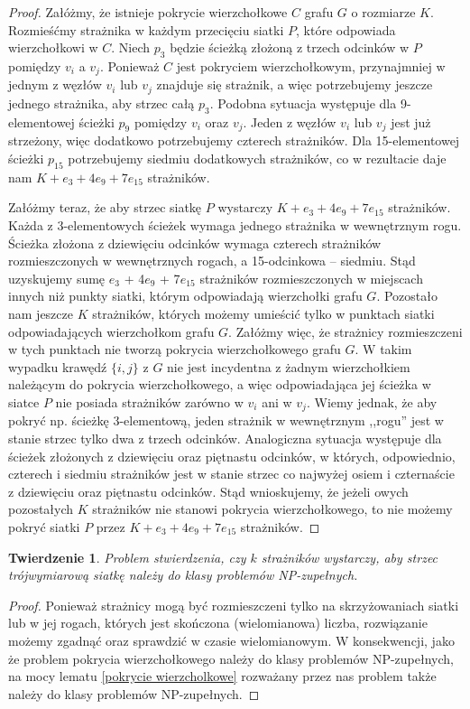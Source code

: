 \documentclass{xmgr}
\newtheorem{Twierdzenie}{Twierdzenie}
\theoremstyle{definition}
\begin{document}
\begin{proof} 
	Załóżmy, że istnieje pokrycie wierzchołkowe $C$ grafu $G$ o rozmiarze $K$. Rozmieśćmy strażnika w każdym przecięciu siatki $P$, które odpowiada wierzchołkowi w $C$.
	Niech $p_3$ będzie ścieżką złożoną z trzech odcinków w $P$ pomiędzy $v_i$ a $v_j$. Ponieważ $C$ jest pokryciem wierzchołkowym, przynajmniej w jednym z węzłów $v_i$ lub $v_j$ znajduje się strażnik, a więc potrzebujemy jeszcze jednego strażnika, aby strzec całą $p_3$. Podobna sytuacja występuje dla 9-elementowej ścieżki $p_9$ pomiędzy $v_i$ oraz $v_j$. Jeden z węzłów $v_i$ lub $v_j$ jest już strzeżony, więc dodatkowo potrzebujemy czterech strażników. Dla 15-elementowej ścieżki $p_{15}$ potrzebujemy siedmiu dodatkowych strażników, co w rezultacie daje nam $K + e_3 + 4e_9 + 7e_{15}$ strażników.

	\indent Załóżmy teraz, że aby strzec siatkę $P$ wystarczy $K + e_3 + 4e_9 + 7e_{15}$ strażników. Każda z 3-elementowych ścieżek wymaga jednego strażnika w wewnętrznym rogu. Ścieżka złożona z dziewięciu odcinków wymaga czterech strażników rozmieszczonych w wewnętrznych rogach, a 15-odcinkowa -- siedmiu. Stąd uzyskujemy sumę $e_3$ + 4$e_9$ + 7$e_{15}$ strażników rozmieszczonych w miejscach innych niż punkty siatki, którym odpowiadają wierzchołki grafu $G$. Pozostało nam jeszcze $K$ strażników, których możemy umieścić tylko w punktach siatki odpowiadających wierzchołkom grafu $G$. Załóżmy więc, że strażnicy rozmieszczeni w tych punktach nie tworzą pokrycia wierzchołkowego grafu $G$. W takim wypadku krawędź $\{i, j\}$ z $G$ nie jest incydentna z żadnym wierzchołkiem należącym do pokrycia wierzchołkowego, a więc odpowiadająca jej ścieżka w siatce $P$ nie posiada strażników zarówno w $v_i$ ani w $v_j$. Wiemy jednak, że aby pokryć np. ścieżkę 3-elementową, jeden strażnik w wewnętrznym ,,rogu'' jest w stanie strzec tylko dwa z trzech odcinków. Analogiczna sytuacja występuje dla ścieżek złożonych z dziewięciu oraz piętnastu odcinków, w których, odpowiednio, czterech i siedmiu strażników jest w stanie strzec co najwyżej osiem i czternaście z dziewięciu oraz piętnastu odcinków. Stąd wnioskujemy, że jeżeli owych pozostałych $K$ strażników nie stanowi pokrycia wierzchołkowego, to nie możemy pokryć siatki $P$ przez $K + e_3 + 4e_9 + 7e_{15}$ strażników. 
\end{proof}

\begin{Twierdzenie} \cite{ntafos}
  Problem stwierdzenia, czy $k$ strażników wystarczy, aby strzec trójwymiarową siatkę należy do klasy problemów NP-zupełnych.
\end{Twierdzenie}
\begin{proof} 
	Ponieważ strażnicy mogą być rozmieszczeni tylko na skrzyżowaniach siatki lub w jej rogach, których jest skończona (wielomianowa) liczba, rozwiązanie możemy zgadnąć oraz sprawdzić w czasie wielomianowym. W konsekwencji, jako że problem pokrycia wierzchołkowego należy do klasy problemów NP-zupełnych, na mocy lematu \ref{pokrycie wierzcholkowe} rozważany przez nas problem także należy do klasy problemów NP-zupełnych.
\end{proof}
\end{document}
